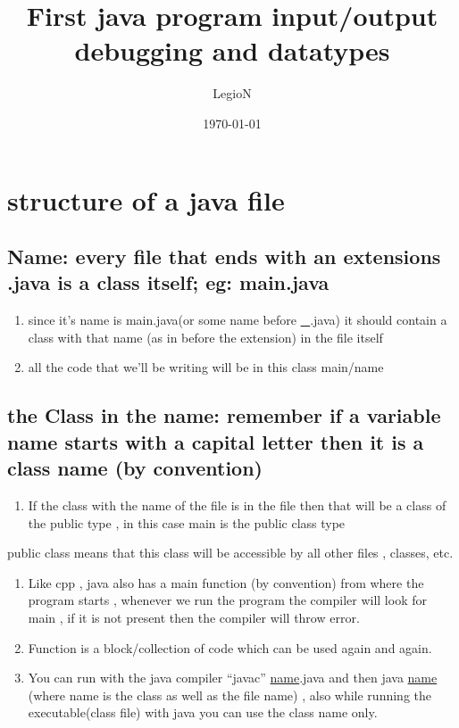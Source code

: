 \documentclass[11pt]{article}
\author{LegioN}
\date{\today}
\title{First java program input/output debugging and datatypes}
\begin{document}
\maketitle
\tableofcontents


\section{structure of a java file}
\label{sec:orge86e4e6}
\subsection{Name: every file that ends with an extensions .java is a class itself; eg: main.java}
\label{sec:org92e92d7}
\begin{enumerate}
\item since it's name is main.java(or some name before \uline{\_}.java) it should contain a class with that name (as in before the extension) in the file itself
\item all the code that we'll be writing will be in this class main/name
\end{enumerate}
\subsection{the Class in the name: remember if a variable name starts with a capital letter then it is a class name (by convention)}
\label{sec:orgff84ef1}
\begin{enumerate}
\item If the class with the name of the file is in the file then that will be a class of the public type , in this case main is the public class type
\end{enumerate}
public class means that this class will be accessible by all other files , classes, etc.
\begin{enumerate}
\item Like cpp , java also has a main function (by convention) from where the program starts , whenever we run the program the compiler will look for main , if it is not present then the compiler will throw error.
\item Function is a block/collection of code which can be used again and again.
\item You can run with the java compiler ``javac'' \uline{name}.java and then java \uline{name} (where name is the class as well as the file name) , also while running the executable(class file) with java you can use the class name only.
\end{enumerate}
\end{document}
